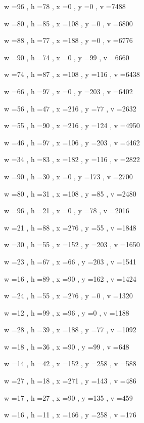 \documentclass[11pt]{article}
\begin{document}
w =96 , h =78 , x =0 , y =0 , v =7488
\par
w =80 , h =85 , x =108 , y =0 , v =6800
\par
w =88 , h =77 , x =188 , y =0 , v =6776
\par
w =90 , h =74 , x =0 , y =99 , v =6660
\par
w =74 , h =87 , x =108 , y =116 , v =6438
\par
w =66 , h =97 , x =0 , y =203 , v =6402
\par
w =56 , h =47 , x =216 , y =77 , v =2632
\par
w =55 , h =90 , x =216 , y =124 , v =4950
\par
w =46 , h =97 , x =106 , y =203 , v =4462
\par
w =34 , h =83 , x =182 , y =116 , v =2822
\par
w =90 , h =30 , x =0 , y =173 , v =2700
\par
w =80 , h =31 , x =108 , y =85 , v =2480
\par
w =96 , h =21 , x =0 , y =78 , v =2016
\par
w =21 , h =88 , x =276 , y =55 , v =1848
\par
w =30 , h =55 , x =152 , y =203 , v =1650
\par
w =23 , h =67 , x =66 , y =203 , v =1541
\par
w =16 , h =89 , x =90 , y =162 , v =1424
\par
w =24 , h =55 , x =276 , y =0 , v =1320
\par
w =12 , h =99 , x =96 , y =0 , v =1188
\par
w =28 , h =39 , x =188 , y =77 , v =1092
\par
w =18 , h =36 , x =90 , y =99 , v =648
\par
w =14 , h =42 , x =152 , y =258 , v =588
\par
w =27 , h =18 , x =271 , y =143 , v =486
\par
w =17 , h =27 , x =90 , y =135 , v =459
\par
w =16 , h =11 , x =166 , y =258 , v =176
\par
\newpage
\end{document}
